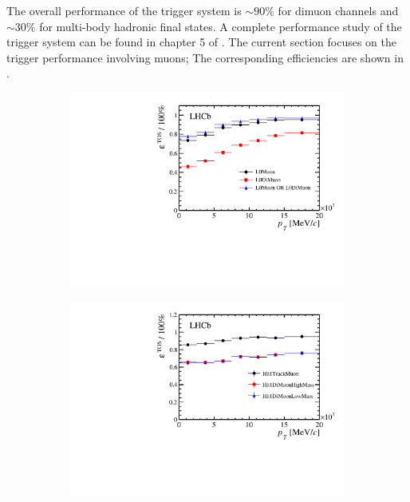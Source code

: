 The overall performance of the \lhcb trigger system is $\sim 90\%$ for dimuon channels and $\sim 30\%$ for
multi-body hadronic final states. A complete performance study of the trigger system can be found in chapter
5 of \cite{Aaij:2014jba}. The current section focuses on the trigger performance involving muons;
The corresponding efficiencies are shown in .

\begin{figure}[t]
  \centering
  \begin{subfigure}{0.5\textwidth}
    \raggedright
    \includegraphics[width=\textwidth,trim=0.45cm 0cm 0.4cm 0cm, clip=true]{Figures/Chapter2/l0_muon_eff}
    \caption{}
    \label{det_run_one_l0_muon_line_eff}
  \end{subfigure}%
  \hfill%
  \begin{subfigure}{0.5\textwidth}
    \raggedleft
    \includegraphics[width=\textwidth,trim=0.45cm 0cm 0.4cm 0cm, clip=true]{Figures/Chapter2/hlt1_muon_eff}

\end{subfigure}
\end{figure}
